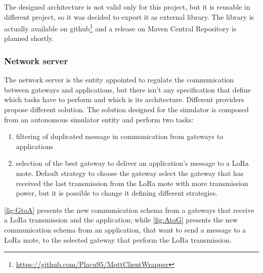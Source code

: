 \noindent The designed architecture is not valid only for this project, but it is reusable in different project, so it was decided to export it as external library. The library is actually available on github\footnote{\href{https://github.com/Placu95/MqttClientWrapper}{https://github.com/Placu95/MqttClientWrapper}} and a release on Maven Central Repository is planned shortly.

\subsubsection{Network server}
The network server is the entity appointed to regulate the communication between gateways and applications, but there isn't any specification that define which tasks have to perform and which is its architecture. 
Different providers propose different solution. 
The solution designed for the simulator is composed from an autonomous simulator entity and perform two tasks:
\begin{enumerate}
    \item filtering of duplicated message in communication from gateways to applications
    \item selection of the best gateway to deliver an application's message to a LoRa mote. 
    Default strategy to choose the gateway select the gateway that has received the last transmission from the LoRa mote with more transmission power, but it is possible to change it defining different strategies. 
\end{enumerate}
\autoref{fig:GtoA} presents the new communication schema from a gateways that receive a LoRa transmission and the application; while \autoref{fig:AtoG} presents the new communication schema from an application, that want to send a message to a LoRa mote, to the selected gateway that perform the LoRa transmission.
